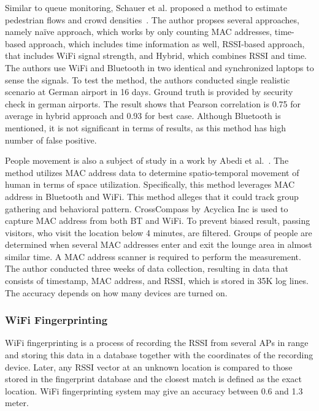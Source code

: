 	Similar to queue monitoring, Schauer et al. proposed a method to estimate pedestrian flows and crowd densities~\cite{thesis011}. The author propses several approaches, namely na\"{i}ve approach, which works by only counting MAC addresses, time-based approach, which includes time information as well, \ac{RSSI}-based approach, that includes WiFi signal strength, and Hybrid, which combines \ac{RSSI} and time. The authors use WiFi and Bluetooth in two identical and synchronized laptops to sense the signals. To test the method, the authors conducted single realistic scenario at German airport in 16 days.
	Ground truth is provided by security check in german airports. The result shows that Pearson correlation is 0.75 for average in hybrid approach and 0.93 for best case. Although Bluetooth is mentioned, it is not significant in terms of results, as this method has high number of false positive. 

	People movement is also a subject of study in a work by Abedi et al.~\cite{thesis017}. The method utilizes MAC address data to determine spatio-temporal movement of human in terms of space utilization. Specifically, this method leverages MAC address in Bluetooth and WiFi. This method alleges that it could track group gathering and behavioral pattern. CrossCompass by Acyclica Inc is used to capture MAC address from both BT and WiFi. To prevent biased result, passing visitors, who visit the location below 4 minutes, are filtered. Groups of people are determined when several MAC addresses enter and exit the lounge area in almost similar time. A MAC address scanner is required to perform the measurement. The author conducted three weeks of data collection, resulting in data that consists of timestamp, \ac{MAC} address, and RSSI, which is stored in 35K log lines. The accuracy depends on how many devices are turned on.

	

	







	\subsubsection{WiFi Fingerprinting} %
	\label{ssub:wifi_fingerprinting}
	WiFi fingerprinting is a process of recording the \ac{RSSI} from several \ac{AP}s in range and storing this data in a database together with the coordinates of the recording device. Later, any \ac{RSSI} vector at an unknown location is compared to those stored in the fingerprint database and the closest match is defined as the exact location. WiFi fingerprinting system may give an accuracy between 0.6 and 1.3 meter.\cite{Youssef2008}

